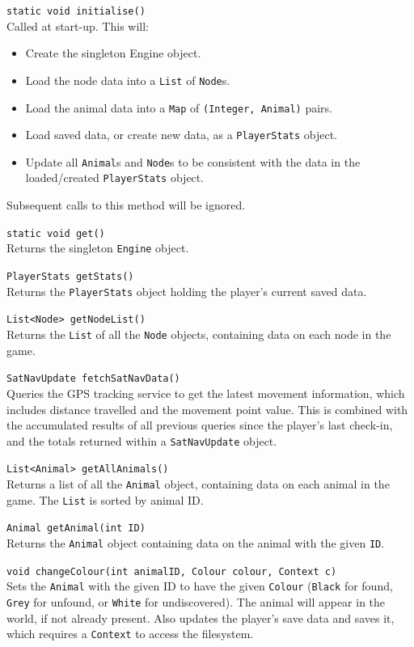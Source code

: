 \documentclass[12pt,a4paper,twoside]{article}
\begin{document}
\verb|static void initialise()|\\
Called at start-up. This will:
\begin{itemize}
\item Create the singleton Engine object.
\item Load the node data into a \verb|List| of \verb|Node|s.
\item Load the animal data into a \verb|Map| of \verb|(Integer, Animal)| pairs.
\item Load saved data, or create new data, as a \verb|PlayerStats| object.
\item Update all \verb|Animal|s and \verb|Node|s to be consistent with the data in the loaded/created \verb|PlayerStats| object.
\end{itemize}
Subsequent calls to this method will be ignored.

\verb|static void get()|\\
Returns the singleton \verb|Engine| object.

\verb|PlayerStats getStats()|\\
Returns the \verb|PlayerStats| object holding the player's current saved data.

\verb|List<Node> getNodeList()|\\
Returns the \verb|List| of all the \verb|Node| objects, containing data on each node in the game.

\verb|SatNavUpdate fetchSatNavData()|\\
Queries the GPS tracking service to get the latest movement information, which includes distance travelled and the movement point value. This is combined with the accumulated results of all previous queries since the player's last check-in, and the totals returned within a \verb|SatNavUpdate| object.

\verb|List<Animal> getAllAnimals()|\\
Returns a list of all the \verb|Animal| object, containing data on each animal in the game. The \verb|List| is sorted by animal ID.

\verb|Animal getAnimal(int ID)|\\
Returns the \verb|Animal| object containing data on the animal with the given \verb|ID|.

\verb|void changeColour(int animalID, Colour colour, Context c)|\\
Sets the \verb|Animal| with the given ID to have the given \verb|Colour| (\verb|Black| for found, \verb|Grey| for unfound, or \verb|White| for undiscovered). The animal will appear in the world, if not already present. Also updates the player's save data and saves it, which requires a \verb|Context| to access the filesystem.
\end{document}

